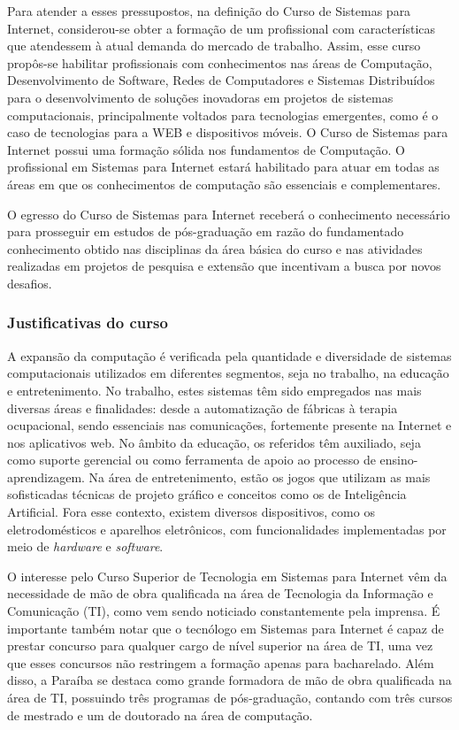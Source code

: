 Para atender a esses pressupostos, na definição do Curso de Sistemas para Internet, considerou-se obter a formação de um profissional com características que atendessem à atual demanda do mercado de trabalho. Assim, esse curso propôs-se habilitar profissionais com conhecimentos nas áreas de Computação, Desenvolvimento de Software, Redes de Computadores e Sistemas Distribu\'idos para o desenvolvimento de soluções inovadoras em projetos de sistemas computacionais, principalmente voltados para tecnologias emergentes, como \'e o caso de tecnologias para a WEB e dispositivos m\'oveis. O Curso de Sistemas para Internet possui uma formação sólida nos fundamentos de Computação. O profissional em Sistemas para Internet estará habilitado para atuar em todas as áreas em que os conhecimentos de computação são essenciais e complementares.  

O egresso do Curso de Sistemas para Internet receberá o conhecimento necessário para prosseguir em estudos de pós-graduação em razão do fundamentado conhecimento obtido nas disciplinas da área básica do curso e nas atividades realizadas em projetos de pesquisa e extensão que incentivam a busca por novos desafios.

\subsubsection{Justificativas do curso}

A expansão da computação é verificada pela quantidade e diversidade de sistemas computacionais utilizados em diferentes segmentos, seja no trabalho, na educação e entretenimento. No trabalho, estes sistemas têm sido empregados nas mais diversas áreas e finalidades: desde a automatização de fábricas à terapia ocupacional, sendo essenciais nas comunicações, fortemente presente na Internet e nos aplicativos web. No âmbito da educação, os referidos têm auxiliado, seja como suporte gerencial ou como ferramenta de apoio ao processo de ensino-aprendizagem. Na área de entretenimento, estão os jogos que utilizam as mais sofisticadas técnicas de projeto gráfico e conceitos como os de Inteligência Artificial. Fora esse contexto, existem diversos dispositivos, como os eletrodomésticos e aparelhos eletrônicos, com funcionalidades implementadas por meio de \textit{hardware} e \textit{software}.


O interesse pelo Curso Superior de Tecnologia em Sistemas para Internet vêm da necessidade de mão de obra qualificada na área de Tecnologia da Informação e Comunicação (TI), como vem sendo noticiado constantemente pela imprensa. É importante também notar que o tecnólogo em Sistemas para Internet é capaz de prestar concurso para qualquer cargo de nível superior na área de TI, uma vez que esses concursos não restringem a formação apenas para bacharelado. Além disso, a Paraíba se destaca como grande formadora de mão de obra qualificada na área de TI, possuindo três programas de pós-graduação, contando com três cursos de mestrado e um de doutorado na área de computação.%

